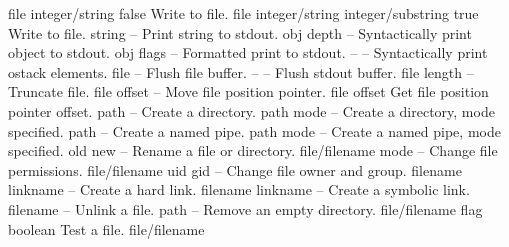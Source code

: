 \begin{longtable}{}
	{file integer/string}
	{{\bf {}}}
	{false}
	{Write to file.}
\optableent
	{file integer/string}
	{{\bf {}}}
	{integer/substring true}
	{Write to file.}
\hline
\optableent
	{string}
	{{\bf {}}}
	{--}
	{Print string to stdout.}
\hline
\optableent
	{obj depth}
	{{\bf {}}}
	{--}
	{Syntactically print object to stdout.}
\hline
\optableent
	{obj flags}
	{{\bf {}}}
	{--}
	{Formatted print to stdout.}
\hline
\optableent
	{--}
	{{\bf {}}}
	{--}
	{Syntactically print ostack elements.}
\hline
\optableent
	{file}
	{{\bf {}}}
	{--}
	{Flush file buffer.}
\hline
\optableent
	{--}
	{{\bf {}}}
	{--}
	{Flush stdout buffer.}
\hline
\optableent
	{file length}
	{{\bf {}}}
	{--}
	{Truncate file.}
\hline
\optableent
	{file offset}
	{{\bf {}}}
	{--}
	{Move file position pointer.}
\hline
\optableent
	{file}
	{{\bf {}}}
	{offset}
	{Get file position pointer offset.}
\hline
\optableent
	{path}
	{{\bf {}}}
	{--}
	{Create a directory.}
\optableent
	{path mode}
	{{\bf {}}}
	{--}
	{Create a directory, mode specified.}
\hline
\optableent
	{path}
	{{\bf {}}}
	{--}
	{Create a named pipe.}
\optableent
	{path mode}
	{{\bf {}}}
	{--}
	{Create a named pipe, mode specified.}
\hline
\optableent
	{old new}
	{{\bf {}}}
	{--}
	{Rename a file or directory.}
\hline
\optableent
	{file/filename mode}
	{{\bf {}}}
	{--}
	{Change file permissions.}
\hline
\optableent
	{file/filename uid gid}
	{{\bf {}}}
	{--}
	{Change file owner and group.}
\hline
\optableent
	{filename linkname}
	{{\bf {}}}
	{--}
	{Create a hard link.}
\hline
\optableent
	{filename linkname}
	{{\bf {}}}
	{--}
	{Create a symbolic link.}
\hline
\optableent
	{filename}
	{{\bf {}}}
	{--}
	{Unlink a file.}
\hline
\optableent
	{path}
	{{\bf {}}}
	{--}
	{Remove an empty directory.}
\hline
\optableent
	{file/filename flag}
	{{\bf {}}}
	{boolean}
	{Test a file.}
\hline
\optableent
	{file/filename}
	{{\bf {}}}

\end{longtable}
